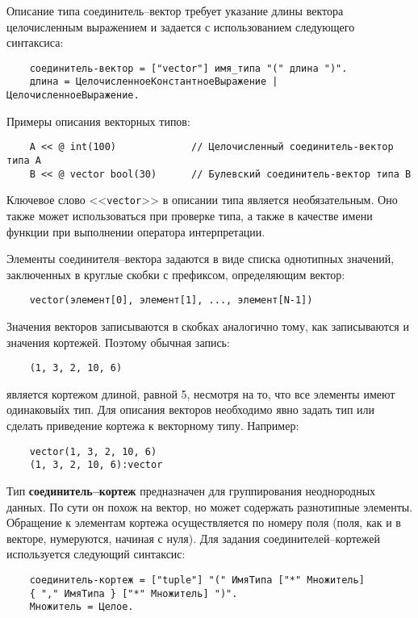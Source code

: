{Описание типа соединитель--вектор требует указание длины вектора целочисленным выражением и задается с использованием следующего синтаксиса:

\begin{verbatim}
    соединитель-вектор = ["vector"] имя_типа "(" длина ")".
    длина = ЦелочисленноеКонстантноеВыражение | ЦелочисленноеВыражение.
\end{verbatim}

Примеры описания векторных типов:

\begin{verbatim}
    A << @ int(100)             // Целочисленный соединитель-вектор типа А
    B << @ vector bool(30)      // Булевский соединитель-вектор типа B
\end{verbatim}

Ключевое слово <<\verb|vector|>> в описании типа является необязательным. Оно также может использоваться при проверке типа, а также в качестве имени функции при выполнении оператора интерпретации.

Элементы соединителя--вектора задаются в виде списка однотипных значений, заключенных в круглые скобки с префиксом, определяющим вектор:

\begin{verbatim}
    vector(элемент[0], элемент[1], ..., элемент[N-1])
\end{verbatim}
Значения векторов записываются в скобках аналогично тому, как записываются и значения кортежей. Поэтому обычная запись:

\begin{verbatim}
    (1, 3, 2, 10, 6)
\end{verbatim}

является кортежом длиной, равной 5, несмотря на то, что все элементы имеют одинаковыйх тип. Для описания векторов необходимо явно задать тип или сделать приведение кортежа к векторному типу. Например:

\begin{verbatim}
    vector(1, 3, 2, 10, 6)
    (1, 3, 2, 10, 6):vector
\end{verbatim}

Тип \textbf{соединитель--кортеж} предназначен для группирования неоднородных данных. По сути он похож на вектор, но может содержать разнотипные элементы. Обращение к элементам кортежа осуществляется по номеру поля (поля, как и в векторе, нумеруются, начиная с нуля). Для задания соединителей--кортежей используется следующий синтаксис:

\begin{verbatim}
    соединитель-кортеж = ["tuple"] "(" ИмяТипа ["*" Множитель]
    { "," ИмяТипа } ["*" Множитель] ")".
    Множитель = Целое.
\end{verbatim}

}
